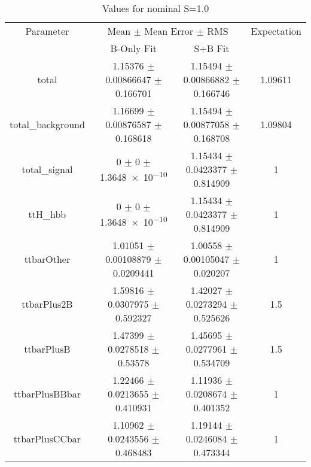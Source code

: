 \begin{table}
\centering
\caption{Values for nominal S=1.0}
\begin{tabular}{cccc}
\toprule
Parameter & \multicolumn{2}{c}{Mean $\pm$ Mean Error $\pm$ RMS} & Expectation\\
 & B-Only Fit & S+B Fit & \\
\midrule
total & \num{1.15376} $\pm$ \num{0.00866647} $\pm$ \num{0.166701} & \num{1.15494} $\pm$ \num{0.00866882} $\pm$ \num{0.166746} & \num{1.09611}\\
total\_background & \num{1.16699} $\pm$ \num{0.00876587} $\pm$ \num{0.168618} & \num{1.15494} $\pm$ \num{0.00877058} $\pm$ \num{0.168708} & \num{1.09804}\\
total\_signal & \num{0} $\pm$ \num{0} $\pm$ \num{1.3648e-10} & \num{1.15434} $\pm$ \num{0.0423377} $\pm$ \num{0.814909} & \num{1}\\
ttH\_hbb & \num{0} $\pm$ \num{0} $\pm$ \num{1.3648e-10} & \num{1.15434} $\pm$ \num{0.0423377} $\pm$ \num{0.814909} & \num{1}\\
ttbarOther & \num{1.01051} $\pm$ \num{0.00108879} $\pm$ \num{0.0209441} & \num{1.00558} $\pm$ \num{0.00105047} $\pm$ \num{0.020207} & \num{1}\\
ttbarPlus2B & \num{1.59816} $\pm$ \num{0.0307975} $\pm$ \num{0.592327} & \num{1.42027} $\pm$ \num{0.0273294} $\pm$ \num{0.525626} & \num{1.5}\\
ttbarPlusB & \num{1.47399} $\pm$ \num{0.0278518} $\pm$ \num{0.53578} & \num{1.45695} $\pm$ \num{0.0277961} $\pm$ \num{0.534709} & \num{1.5}\\
ttbarPlusBBbar & \num{1.22466} $\pm$ \num{0.0213655} $\pm$ \num{0.410931} & \num{1.11936} $\pm$ \num{0.0208674} $\pm$ \num{0.401352} & \num{1}\\
ttbarPlusCCbar & \num{1.10962} $\pm$ \num{0.0243556} $\pm$ \num{0.468483} & \num{1.19144} $\pm$ \num{0.0246084} $\pm$ \num{0.473344} & \num{1}\\
\bottomrule
\end{tabular}
\end{table}